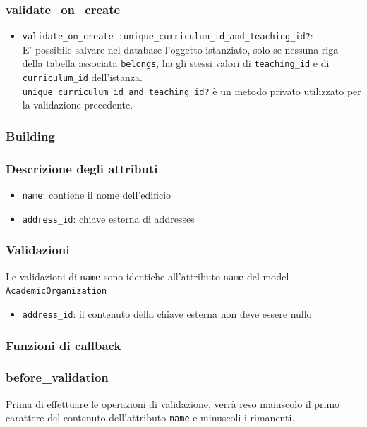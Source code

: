 \documentclass[11pt,a4paper]{article}
\begin{document}
\subsubsection*{validate\_on\_create}
\begin{itemize}
 \item \verb|validate_on_create :unique_curriculum_id_and_teaching_id?|: \\E' possibile salvare nel database l'oggetto istanziato, solo se nessuna riga della tabella associata \verb|belongs|, ha gli stessi valori di \verb|teaching_id| e di \verb|curriculum_id| dell'istanza.\\
 \verb|unique_curriculum_id_and_teaching_id?| è un metodo privato utilizzato per la validazione precedente.
\end{itemize}
\subsubsection{Building}
\subsubsection*{Descrizione degli attributi}
\begin{itemize}
 \item \verb|name|: contiene il nome dell'edificio
 \item \verb|address_id|: chiave esterna di addresses
\end{itemize}
\subsubsection*{Validazioni}
Le validazioni di \verb|name| sono identiche all'attributo \verb|name| del model \\ \verb|AcademicOrganization|
\begin{itemize}
 \item \verb|address_id|: il contenuto della chiave esterna non deve essere nullo
\end{itemize}
\subsubsection*{Funzioni di callback}
\subsubsection*{before\_validation}
Prima di effettuare le operazioni di validazione, verrà reso maiuscolo il primo carattere del contenuto dell'attributo \verb|name| e minuscoli i rimanenti.
\end{document}
